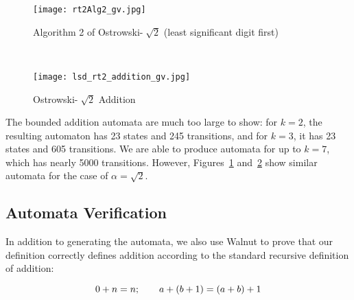 \documentclass[landscape]{sciposter}
\begin{document}
\begin{multicols}{3}
\begin{minipage}{.45\columnwidth}

\begin{figure}
	\centering
    \texttt{[image: rt2Alg2\_gv.jpg]}
    \caption{Algorithm 2 of Ostrowski-$\sqrt[~]{2}$ (least significant digit first)}
    \label{fig:rt2_alg2}
\end{figure}
\end{minipage} ~~ %
\begin{minipage}{.45\columnwidth}
\begin{figure}
	\centering
    \texttt{[image: lsd\_rt2\_addition\_gv.jpg]}
    \caption{Ostrowski-$\sqrt[~]{2}$ Addition}
    \label{fig:rt2_addition}
\end{figure}
\end{minipage}

The bounded addition automata are much too large to show: for $k=2$, the resulting automaton has 23 states and 245 transitions, and for $k=3$, it has 23 states and 605 transitions.
We are able to produce automata for up to $k=7$, which has nearly 5000 transitions.
However, Figures~\ref{fig:rt2_alg2} and~\ref{fig:rt2_addition} show similar automata for the case of $\alpha = \sqrt{2}$.



\begin{mdframed}[style=MyFrame]
\subsection*{Automata Verification}
\end{mdframed}

In addition to generating the automata, we also use Walnut to prove that our definition correctly defines addition according to the standard recursive definition of addition:

$$0 + n = n; \quad \quad a + (b + 1) = (a + b) + 1\\$$


\end{multicols}
\end{document}
